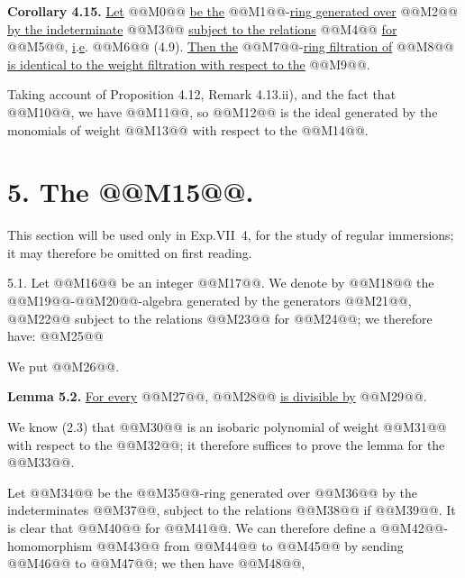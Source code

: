 \textbf{Corollary 4.15.} \uline{Let} @@M0@@ \uline{be the} @@M1@@-\uline{ring generated over} @@M2@@ \uline{by the indeterminate} @@M3@@ \uline{subject to the relations} @@M4@@ \uline{for} @@M5@@, \uline{i}.\uline{e}. @@M6@@ (4.9). \uline{Then the} @@M7@@-\uline{ring filtration of} @@M8@@ \uline{is identical to the weight filtration with respect to the} @@M9@@.

Taking account of Proposition 4.12, Remark 4.13.ii), and the fact that @@M10@@, we have @@M11@@, so @@M12@@ is the ideal generated by the monomials of weight @@M13@@ with respect to the @@M14@@.

\section*{5. The @@M15@@.}

This section will be used only in Exp.VII~4, for the study of regular immersions; it may therefore be omitted on first reading.

5.1. Let @@M16@@ be an integer @@M17@@. We denote by @@M18@@ the @@M19@@-@@M20@@-algebra generated by the generators @@M21@@, @@M22@@ subject to the relations @@M23@@ for @@M24@@; we therefore have:
@@M25@@

We put @@M26@@.

\textbf{Lemma 5.2.} \uline{For every} @@M27@@, @@M28@@ \uline{is divisible by} @@M29@@.

We know (2.3) that @@M30@@ is an isobaric polynomial of weight @@M31@@ with respect to the @@M32@@; it therefore suffices to prove the lemma for the @@M33@@.

Let @@M34@@ be the @@M35@@-ring generated over @@M36@@ by the indeterminates @@M37@@, subject to the relations @@M38@@ if @@M39@@. It is clear that @@M40@@ for @@M41@@. We can therefore define a @@M42@@-homomorphism @@M43@@ from @@M44@@ to @@M45@@ by sending @@M46@@ to @@M47@@; we then have @@M48@@,
